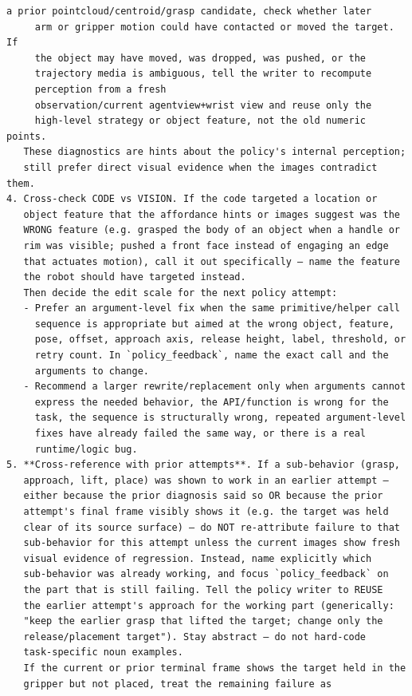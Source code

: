 \documentclass{llmxive}
\begin{document}
\begin{lstlisting}[style=ratsappendixprompt]
     a prior pointcloud/centroid/grasp candidate, check whether later
     arm or gripper motion could have contacted or moved the target. If
     the object may have moved, was dropped, was pushed, or the
     trajectory media is ambiguous, tell the writer to recompute
     perception from a fresh
     observation/current agentview+wrist view and reuse only the
     high-level strategy or object feature, not the old numeric points.
   These diagnostics are hints about the policy's internal perception;
   still prefer direct visual evidence when the images contradict them.
4. Cross-check CODE vs VISION. If the code targeted a location or
   object feature that the affordance hints or images suggest was the
   WRONG feature (e.g. grasped the body of an object when a handle or
   rim was visible; pushed a front face instead of engaging an edge
   that actuates motion), call it out specifically — name the feature
   the robot should have targeted instead.
   Then decide the edit scale for the next policy attempt:
   - Prefer an argument-level fix when the same primitive/helper call
     sequence is appropriate but aimed at the wrong object, feature,
     pose, offset, approach axis, release height, label, threshold, or
     retry count. In `policy_feedback`, name the exact call and the
     arguments to change.
   - Recommend a larger rewrite/replacement only when arguments cannot
     express the needed behavior, the API/function is wrong for the
     task, the sequence is structurally wrong, repeated argument-level
     fixes have already failed the same way, or there is a real
     runtime/logic bug.
5. **Cross-reference with prior attempts**. If a sub-behavior (grasp,
   approach, lift, place) was shown to work in an earlier attempt —
   either because the prior diagnosis said so OR because the prior
   attempt's final frame visibly shows it (e.g. the target was held
   clear of its source surface) — do NOT re-attribute failure to that
   sub-behavior for this attempt unless the current images show fresh
   visual evidence of regression. Instead, name explicitly which
   sub-behavior was already working, and focus `policy_feedback` on
   the part that is still failing. Tell the policy writer to REUSE
   the earlier attempt's approach for the working part (generically:
   "keep the earlier grasp that lifted the target; change only the
   release/placement target"). Stay abstract — do not hard-code
   task-specific noun examples.
   If the current or prior terminal frame shows the target held in the
   gripper but not placed, treat the remaining failure as

\end{lstlisting}
\end{document}
